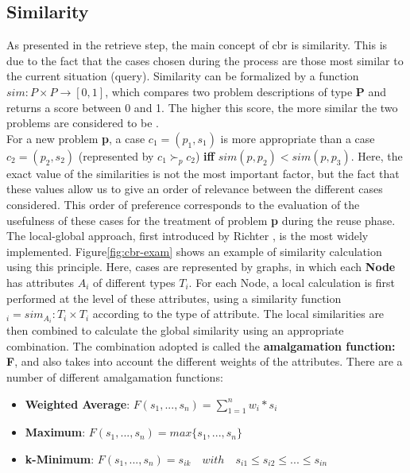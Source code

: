     \subsection{Similarity\label{subsec:similarity}}
    As presented in the retrieve step, the main concept of \acrshort{cbr} is similarity. This is due to the fact that the cases chosen during the process are those most similar to the current situation (query). Similarity can be formalized by a function $sim: P \times P \rightarrow [0, 1]$, which compares two problem descriptions of type \textbf{P} and returns a score between 0 and 1. The higher this score, the more similar the two problems are considered to be \cite{cbrIntroRecent}.\\
    For a new problem \textbf{p}, a case $c_1 = (p_1, s_1)$ is more appropriate than a case $c_2 = (p_2, s_2)$ (represented by $c_1 \succ_p c_2$) \textbf{iff} $sim(p, p_2) < sim(p, p_3)$. Here, the exact value of the similarities is not the most important factor, but the fact that these values allow us to give an order of relevance between the different cases considered. This order of preference corresponds to the evaluation of the usefulness of these cases for the treatment of problem \textbf{p} during the reuse phase.\\
    
    The local-global approach, first introduced by Richter \cite{richter2008similarity, richter2013basic}, is the most widely implemented. Figure\ref{fig:cbr-exam} shows an example of similarity calculation using this principle. Here, cases are represented by graphs, in which each \textbf{Node} has attributes $A_i$ of different types $T_i$. For each Node, a local calculation is first performed at the level of these attributes, using a similarity function $_i = sim_{A_i} : T_i \times T_i$ according to the type of attribute. The local similarities are then combined to calculate the global similarity using an appropriate combination. The combination adopted is called the \textbf{amalgamation function: F}, and also takes into account the different weights of the attributes. There are a number of different amalgamation functions:
    \begin{itemize}
        \item \textbf{Weighted Average}: $F(s_1,...,s_n)= \sum_{1=1}^{n} w_i*s_i$
        \item \textbf{Maximum}: $F(s_1,...,s_n) = max\{s_1,...,s_n\}$
        \item \textbf{k-Minimum}: $F(s_1,...,s_n) = s_{ik} \quad with \quad s_{i1} \leq s_{i2} \leq ... \leq s_{in}$
    \end{itemize}
    
